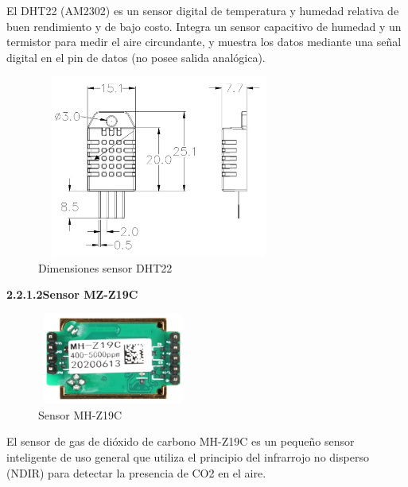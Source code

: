 El DHT22 (AM2302) es un sensor digital de temperatura y humedad relativa de buen rendimiento y de bajo costo. Integra un sensor capacitivo de humedad y un termistor para medir el aire circundante, y muestra los datos mediante una señal digital en el pin de datos (no posee salida analógica).\\

\begin{figure}[H]
    \centering
    \includegraphics[width=8cm, height=6cm]{imagenes/dht22 dimensiones.jpg}
    \caption{Dimensiones sensor DHT22}
    \label{imag:dimensiones_dht22}
\end{figure}

\vspace{1cm}

        \textbf{2.2.1.2\hspace{5mm}Sensor MZ-Z19C}

\begin{figure}[H]
      \centering
      \includegraphics[width=5cm, height=3cm]{imagenes/mh-z19c.png}
      \caption{Sensor MH-Z19C}
      \label{imag:mh-z19c}
   \end{figure}

El sensor de gas de dióxido de carbono MH-Z19C es un pequeño sensor inteligente de uso general que utiliza el principio del infrarrojo no disperso (NDIR) para detectar la presencia de CO2 en el aire.\\

